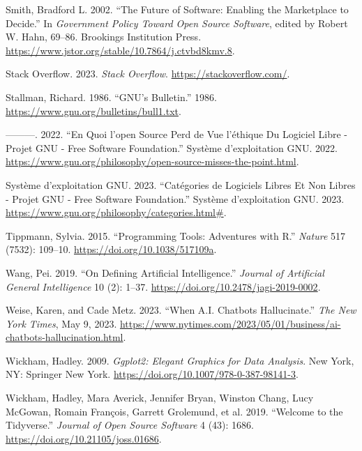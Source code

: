 \documentclass[
  letterpaper,
]{scrbook}
\newlength{\cslhangindent}
\newlength{\cslentryspacingunit} %
\newenvironment{CSLReferences}[2] %
 {%
  \setlength{\parindent}{0pt}
  \ifodd #1
  \let\oldpar\par
  \def\par{\hangindent=\cslhangindent\oldpar}
  \fi
  \setlength{\parskip}{#2\cslentryspacingunit}
 }%
 {}
\begin{document}
\begin{CSLReferences}{1}{0}
\leavevmode{}%
Smith, Bradford L. 2002. {``The {Future} of {Software}: {Enabling} the
{Marketplace} to {Decide}.''} In \emph{Government {Policy} Toward {Open
Source Software}}, edited by Robert W. Hahn, 69--86. Brookings
Institution Press.
\url{https://www.jstor.org/stable/10.7864/j.ctvbd8kmv.8}.

\leavevmode{}%
Stack Overflow. 2023. \emph{Stack {Overflow}}.
\url{https://stackoverflow.com/}.

\leavevmode{}%
Stallman, Richard. 1986. {``{GNU}'s {Bulletin}.''} 1986.
\url{https://www.gnu.org/bulletins/bull1.txt}.

\leavevmode{}%
---------. 2022. {``En Quoi l'open Source Perd de Vue l'éthique Du
Logiciel Libre - {Projet GNU} - {Free Software Foundation}.''} Système
d'exploitation GNU. 2022.
\url{https://www.gnu.org/philosophy/open-source-misses-the-point.html}.

\leavevmode{}%
Système d'exploitation GNU. 2023. {``Catégories de Logiciels Libres Et
Non Libres - {Projet GNU} - {Free Software Foundation}.''} Système
d'exploitation GNU. 2023.
\url{https://www.gnu.org/philosophy/categories.html\#}.

\leavevmode{}%
Tippmann, Sylvia. 2015. {``Programming Tools: {Adventures} with {R}.''}
\emph{Nature} 517 (7532): 109--10.
\url{https://doi.org/10.1038/517109a}.

\leavevmode{}%
Wang, Pei. 2019. {``On {Defining Artificial Intelligence}.''}
\emph{Journal of Artificial General Intelligence} 10 (2): 1--37.
\url{https://doi.org/10.2478/jagi-2019-0002}.

\leavevmode{}%
Weise, Karen, and Cade Metz. 2023. {``When {A}.{I}. {Chatbots
Hallucinate}.''} \emph{The New York Times}, May 9, 2023.
\url{https://www.nytimes.com/2023/05/01/business/ai-chatbots-hallucination.html}.

\leavevmode{}%
Wickham, Hadley. 2009. \emph{Ggplot2: {Elegant Graphics} for {Data
Analysis}}. New York, NY: Springer New York.
\url{https://doi.org/10.1007/978-0-387-98141-3}.

\leavevmode{}%
Wickham, Hadley, Mara Averick, Jennifer Bryan, Winston Chang, Lucy
McGowan, Romain François, Garrett Grolemund, et al. 2019. {``Welcome to
the {Tidyverse}.''} \emph{Journal of Open Source Software} 4 (43): 1686.
\url{https://doi.org/10.21105/joss.01686}.


\end{CSLReferences}
\end{document}
